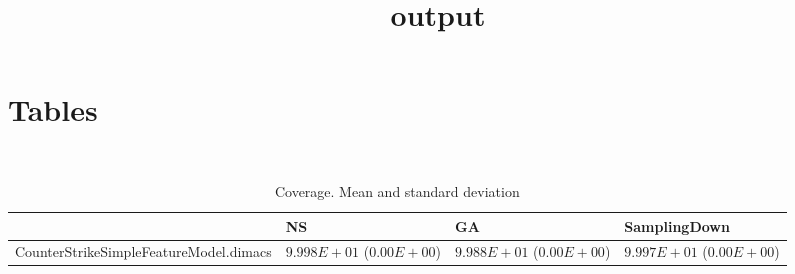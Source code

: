 \documentclass[a3paper]{article}
\title{output}
\author{}
\begin{document}
\maketitle
\section{Tables}
\
\begin{table*}
\caption{Coverage. Mean and standard deviation}
\label{table:mean.Coverage}
\centering
\begin{tiny}
\begin{tabular}{llll}
\hline & NS & GA &  SamplingDown\\
\hline
CounterStrikeSimpleFeatureModel.dimacs & \cellcolor{gray95}$9.998E+01 $ ($0.00E+00$) &$9.988E+01 $ ($0.00E+00$) &$9.997E+01$ ($0.00E+00$) \\
\hline
\end{tabular}
\end{tiny}
\end{table*}
\end{document}
